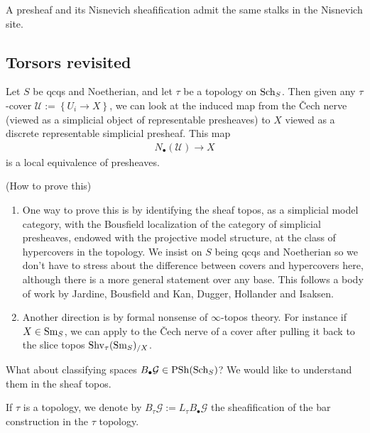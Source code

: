 \documentclass[11pt]{amsart}
\renewcommand{\Pre}{\mathrm{PSh}}
\begin{document}
\begin{corollary} A presheaf and its Nisnevich sheafification admit the same stalks in the Nisnevich site.
\end{corollary}



\subsection{Torsors revisited}

\begin{proposition} Let $S$ be qcqs and Noetherian, and let $\tau$ be a topology on $\mathrm{Sch}_S$. Then given any $\tau$-cover $\mathcal{U}:=\left\{ U_i \to X \right\}$, we can look at the induced map from the \v{C}ech nerve (viewed as a simplicial object of representable presheaves) to $X$ viewed as a discrete representable simplicial presheaf. This map
\begin{align*}
    N_\bullet(\mathcal{U}) \to X
\end{align*}
is a local equivalence of presheaves.
\end{proposition}

\begin{remark} (How to prove this)
\begin{enumerate}
    \item  One way to prove this is by identifying the sheaf topos, as a simplicial model category, with the Bousfield localization of the category of simplicial presheaves, endowed with the projective model structure, at the class of hypercovers in the topology. We insist on $S$ being qcqs and Noetherian so we don't have to stress about the difference between covers and hypercovers here, although there is a more general statement over any base. This follows a body of work by Jardine, Bousfield and Kan, Dugger, Hollander and Isaksen.
    \item Another direction is by formal nonsense of $\infty$-topos theory. For instance if $X\in \mathrm{Sm}_S$, we can apply \cite[A.5.3.1]{SAG} to the \v{C}ech nerve of a cover after pulling it back to the slice topos $\mathrm{Shv}_{\tau}(\mathrm{Sm}_S)_{/X}$.
\end{enumerate}

\end{remark}

What about classifying spaces $B_{\bullet}\mathcal{G}\in \Pre(\Sch_S)$? We would like to understand them in the sheaf topos.

\begin{notation} If $\tau$ is a topology, we denote by $B_\tau \mathcal{G} := L_\tau B_\bullet \mathcal{G}$ the sheafification of the bar construction in the $\tau$ topology.
\end{notation}
\end{document}
